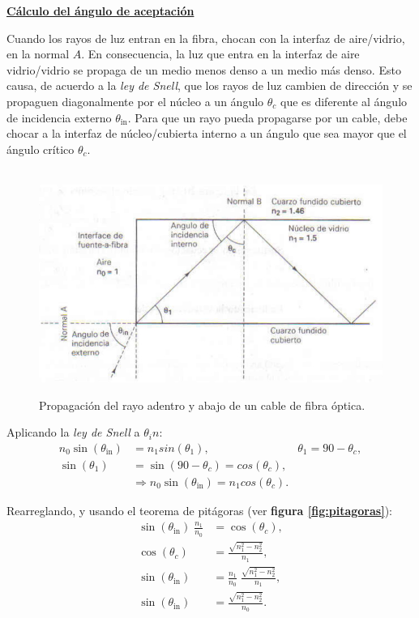 \documentclass[10pt,a4paper]{article}
\begin{document}
\underline{\textbf{Cálculo del ángulo de aceptación}}

Cuando los rayos de luz entran en la fibra, chocan con la interfaz de aire/vidrio, en la normal $A$. En consecuencia, la luz que entra en la interfaz de aire vidrio/vidrio se propaga de un medio menos denso a un medio más denso. Esto causa, de acuerdo a la \textit{ley de Snell}, que los rayos de luz cambien de dirección y se propaguen diagonalmente por el núcleo a un ángulo $\theta_c$ que es diferente al ángulo de incidencia externo $\theta_\text{in}$. Para que un rayo pueda propagarse por un cable, debe chocar a la interfaz de núcleo/cubierta interno a un ángulo que sea mayor que el ángulo crítico $\theta_c$.

\begin{figure}[ht!]
  \caption{Propagación del rayo adentro y abajo de un cable de fibra óptica.}
  \label{fig:calculo_angulo_aceptacion}  
  \centering
  \hbox{
	\includegraphics[width=\textwidth-\fboxrule-\fboxrule]{imgs/calculo_angulo_aceptacion.jpg}}
\end{figure}
 
Aplicando la \textit{ley de Snell} a $\theta_in$:
\begin{align*}
n_0 \sin (\theta_\text{in}) &= n_1 sin (\theta_1), 
&\theta_1 = 90 - \theta_c, \\
\sin (\theta_1) &= \sin(90 - \theta_c) = cos (\theta_c), \\
&\Rightarrow n_0 \sin (\theta_\text{in}) = n_1 cos (\theta_c).
\end{align*} 

Rearreglando, y usando el teorema de pitágoras (ver \textbf{figura \ref{fig:pitagoras}}):
\begin{align*}
\sin (\theta_\text{in}) \; \frac{n_1}{n_0} &= \cos(\theta_c), \\
\cos (\theta_c) &= \frac{\sqrt{n_1^2 - n_2^2}}{n_1}, \\
\sin (\theta_\text{in}) &= \frac{n_1}{n_0} \; \frac{\sqrt{n_1^2 - n_2^2}}{n_1}, \\
\sin (\theta_\text{in}) &= \frac{\sqrt{n_1^2 - n_2^2}}{n_0}.
\end{align*}
\end{document}

